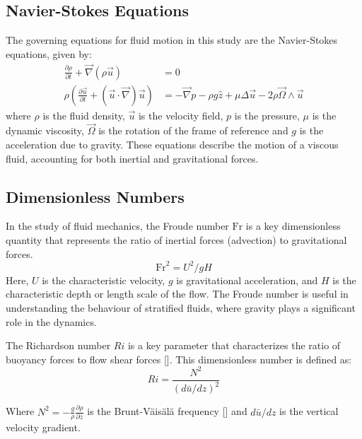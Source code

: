 \documentclass[final,5p,times,twocolumn,authoryear]{elsarticle}
\newcommand{\pd}[2]{\frac{\partial #1}{\partial #2}}
\begin{document}
\subsection{Navier-Stokes Equations}

The governing equations for fluid motion in this study are the Navier-Stokes equations, given by:
\begin{subequations}
\begin{align}
\pd{\rho}{t} + \vec{\nabla} \left( \rho \vec{u} \right) &= 0 \\
\rho \left( \pd{\vec{u}}{t} + \left( \vec{u} \cdot \vec{\nabla} \right) \vec{u} \right) &= - \vec{\nabla} p - \rho g \hat{z} + \mu \Delta \vec{u} - 2 \rho \vec{\Omega} \wedge \vec{u}
\end{align}
\label{eq:NS}
\end{subequations}
where $\rho$ is the fluid density, $\vec{u}$ is the velocity field, $p$ is the pressure, $\mu$ is the dynamic viscosity, $\vec{\Omega}$ is the rotation of the frame of reference and $g$ is the acceleration due to gravity. These equations describe the motion of a viscous fluid, accounting for both inertial and gravitational forces.

\subsection{Dimensionless Numbers}

In the study of fluid mechanics, the Froude number $\mathrm{Fr}$ is a key dimensionless quantity that represents the ratio of inertial forces (advection) to gravitational forces.
\begin{equation*}
	\mathrm{Fr}^2 = U^2 / gH
\end{equation*} 
Here, $U$ is the characteristic velocity, $g$ is gravitational acceleration, and $H$ is the characteristic depth or length scale of the flow. The Froude number is useful in understanding the behaviour of stratified fluids, where gravity plays a significant role in the dynamics.

The Richardson number $Ri$ is a key parameter that characterizes the ratio of buoyancy forces to flow shear forces [\cite{cushman-roisin_introduction_2011}]. This dimensionless number is defined as:
\begin{equation}
Ri = \frac{N^2}{\left(d \bar{u} / dz \right)^2}
\end{equation}

Where $N^2 = -\frac{g}{\rho} \pd{\rho}{z}$ is the Brunt-Väisälä frequency [\cite{pedlosky_geophysical_1979}] and $d \bar{u} / dz$ is the vertical velocity gradient.
\end{document}
